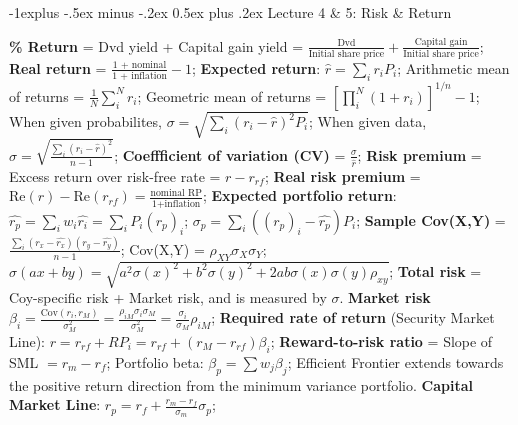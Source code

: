 \documentclass[10pt,landscape]{article}
\makeatletter
\renewcommand{\subsection}{\@startsection{subsection}{2}{0mm}%
                                {-1explus -.5ex minus -.2ex}%
                                {0.5ex plus .2ex}%
                                {\normalfont\normalsize\bfseries}}
\makeatother
\begin{document}
\begin{multicols}{3}
\subsection{Lecture 4 \& 5: Risk \& Return}

\textbf{\% Return} = Dvd yield + Capital gain yield = 
$\frac{\text{Dvd}}{\text{Initial share price}} + \frac{\text{Capital gain}}
{\text{Initial share price}}$;
\textbf{Real return} = $\frac{\text{1 + nominal}}{\text{1 + inflation}}-1$;
\textbf{Expected return}: $\hat{r} = \sum_i r_i P_i$;
Arithmetic mean of returns = $\frac{1}{N}\sum_i^N r_i$;
Geometric mean of returns = $[\prod_i^N (1+r_i)]^{1/n} - 1$;
When given probabilites, $\sigma = \sqrt{\sum_i (r_i - \hat{r})^2 P_i}$;
When given data, $\sigma = \sqrt{\frac{\sum_i (r_i - \hat{r})^2}{n-1}}$;
\textbf{Coeffficient of variation (CV)} = $\frac{\sigma}{\hat{r}}$;
\textbf{Risk premium} = Excess return over risk-free rate = $r - r_{rf}$;
\textbf{Real risk premium} = $\text{Re}(r) - \text{Re}(r_{rf}) =
\frac{\text{nominal RP}}{\text{1+inflation}}$;
\textbf{Expected portfolio return}: $\hat{r_p} = \sum_i w_i \hat{r_i} = \sum_i
P_i (r_p)_i$;
$\sigma_p = \sum_i ((r_p)_i - \hat{r_p})P_i$;
\textbf{Sample Cov(X,Y)} = $\frac{\sum_i (r_x - \hat{r_x})(r_y - \hat{r_y})}{n-1}$;
Cov(X,Y) = $\rho_{XY} \sigma_X \sigma_Y$;
$\sigma(ax+by) = \sqrt{a^2 \sigma(x)^2 + b^2\sigma(y)^2 +
	2ab\sigma(x)\sigma(y)\rho_{xy}}$;
\textbf{Total risk} = Coy-specific risk + Market risk, and is measured by $\sigma$.
\textbf{Market risk} $\beta_i = \frac{\text{Cov}(r_i, r_M)}{\sigma_M^2}
= \frac{\rho_{iM} \sigma_i \sigma_M}{\sigma_M^2}
= \frac{\sigma_i}{\sigma_M}\rho_{iM}$;
\textbf{Required rate of return} (Security Market Line): $r = r_{rf} + RP_i =
	r_{rf} + (r_M - r_{rf})\beta_i$;
\textbf{Reward-to-risk ratio} = Slope of SML $= r_m - r_f$;
Portfolio beta: $\beta_p = \sum w_j \beta_j$;
Efficient Frontier extends towards the positive return direction from the
	minimum variance portfolio.
\textbf{Capital Market Line}: $r_p = r_f + \frac{r_m - r_f}{\sigma_m} \sigma_p$;


\end{multicols}
\end{document}
